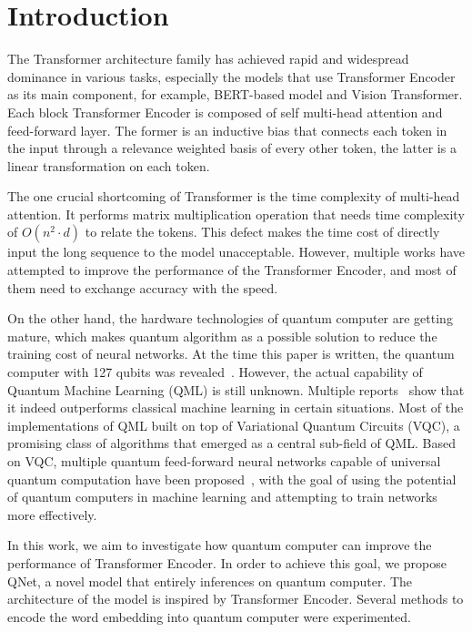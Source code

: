 \section{Introduction}

The Transformer architecture family has achieved rapid and widespread dominance in various tasks, especially the models that use Transformer Encoder as its main component, for example, BERT-based model and Vision Transformer. Each block Transformer Encoder is composed of self multi-head attention and feed-forward layer. The former is an inductive bias that connects each token in the input through a relevance weighted basis of every other token, the latter is a linear transformation on each token.

The one crucial shortcoming of Transformer is the time complexity of multi-head attention. It performs matrix multiplication operation that needs time complexity of $O(n^2 \cdot d)$ to relate the tokens. This defect makes the time cost of directly input the long sequence to the model unacceptable. However, multiple works have attempted to improve the performance of the Transformer Encoder, and most of them need to exchange accuracy with the speed.

On the other hand, the hardware technologies of quantum computer are getting mature, which makes quantum algorithm as a possible solution to reduce the training cost of neural networks. At the time this paper is written, the quantum computer with 127 qubits was revealed~\cite{}. However, the actual capability of Quantum Machine Learning (QML) is still unknown. Multiple reports~\cite{} show that it indeed outperforms classical machine learning in certain situations. Most of the implementations of QML built on top of Variational Quantum Circuits (VQC), a promising class of algorithms that emerged as a central sub-field of QML. Based on VQC, multiple quantum feed-forward neural networks capable of universal quantum computation have been proposed~\cite{}, with the goal of using the potential of quantum computers in machine learning and attempting to train networks more effectively.

In this work, we aim to investigate how quantum computer can improve the performance of Transformer Encoder. In order to achieve this goal, we propose QNet, a novel model that entirely inferences on quantum computer. The architecture of the model is inspired by Transformer Encoder. Several methods to encode the word embedding into quantum computer were experimented.

